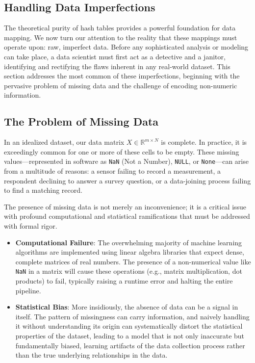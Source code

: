 \begin{itemize}
\section{Handling Data Imperfections}
\label{sec:data_imperfections}

The theoretical purity of hash tables provides a powerful foundation for data mapping. We now turn our attention to the reality that these mappings must operate upon: raw, imperfect data. Before any sophisticated analysis or modeling can take place, a data scientist must first act as a detective and a janitor, identifying and rectifying the flaws inherent in any real-world dataset. This section addresses the most common of these imperfections, beginning with the pervasive problem of missing data and the challenge of encoding non-numeric information.

\subsection{The Problem of Missing Data}
\label{subsec:missing_data_problem}
In an idealized dataset, our data matrix $X \in \mathbb{R}^{m \times N}$ is complete. In practice, it is exceedingly common for one or more of these cells to be empty. These missing values—represented in software as \texttt{NaN} (Not a Number), \texttt{NULL}, or \texttt{None}—can arise from a multitude of reasons: a sensor failing to record a measurement, a respondent declining to answer a survey question, or a data-joining process failing to find a matching record.

The presence of missing data is not merely an inconvenience; it is a critical issue with profound computational and statistical ramifications that must be addressed with formal rigor.
\begin{itemize}
    \item \textbf{Computational Failure}: The overwhelming majority of machine learning algorithms are implemented using linear algebra libraries that expect dense, complete matrices of real numbers. The presence of a non-numerical value like \texttt{NaN} in a matrix will cause these operations (e.g., matrix multiplication, dot products) to fail, typically raising a runtime error and halting the entire pipeline.
    \item \textbf{Statistical Bias}: More insidiously, the absence of data can be a signal in itself. The pattern of missingness can carry information, and naively handling it without understanding its origin can systematically distort the statistical properties of the dataset, leading to a model that is not only inaccurate but fundamentally biased, learning artifacts of the data collection process rather than the true underlying relationships in the data.
\end{itemize}


\end{itemize}
